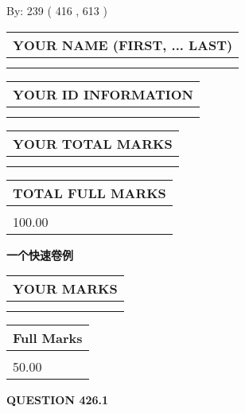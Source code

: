 \documentclass{ctexart}
\begin{document}
   
\hspace{1.0in} By: 
 239 ( 416 ,  613 )
   
   
   
   
\newpage 
\setcounter{page}{ 
   426001 } 
   
   
   
   
\noindent\begin{tabular}{|l|}
\hline
YOUR NAME (FIRST, ... LAST)  \\
\hline
 \\ 
 \\ 
\hline
\end{tabular}
\hspace{0.05in} \begin{tabular}{|l|}
\hline
 YOUR   ID   INFORMATION  \\
\hline
 \\ 
 \\ 
\hline
\end{tabular}
   
   
\vspace{0.2in}\noindent\begin{tabular}{|l|}
\hline
YOUR TOTAL MARKS  \\
\hline
 \\ 
 \\ 
\hline
\end{tabular}
\hspace{0.05in} \begin{tabular}{|l|}
\hline
TOTAL FULL MARKS  \\
\hline
 \\ 
100.00 \\
\hline
\end{tabular}
   
   
 \vspace{0.2in}
{\LARGE {\textbf{ 一个快速卷例}}}
   
   
  
\vspace{0.2in}
  
\noindent\begin{tabular}{|l|}
\hline
 YOUR MARKS  \\
\hline
 \\ 
 \\ 
\hline
\end{tabular}
\hspace{0.05in} \begin{tabular}{|l|}
\hline
 Full Marks  \\
\hline
 \\ 
50.00 \\
\hline
\end{tabular}
{\textbf{\Large{QUESTION
426.1 
}}}
  
\end{document}
